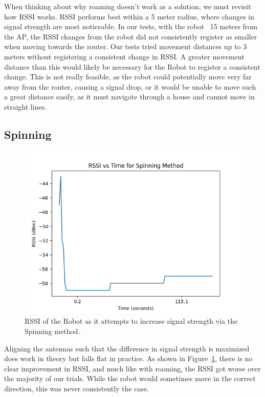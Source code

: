   

When thinking about why roaming doesn’t work as a solution, we must revisit how RSSI works. RSSI performs best within a 5 meter radius, where changes in signal strength are most noticeable. In our tests, with the robot ~15 meters from the AP, the RSSI changes from the robot did not consistently register as smaller when moving towards the router. Our tests tried movement distances up to 3 meters without registering a consistent change in RSSI. A greater movement distance than this would likely be necessary for the Robot to register a consistent change. This is not really feasible, as the robot could potentially move very far away from the router, causing a signal drop, or it would be unable to move such a great distance easily, as it must navigate through a house and cannot move in straight lines.

\subsection{Spinning}

\begin{figure}[tp]

\centering

\includegraphics[scale=0.5]{figures/rssi_microwave}

\caption{RSSI of the Robot as it attempts to increase signal strength via the Spinning method.}

\label{fig:rssi_microwave}

\end{figure}

Aligning the antennas such that the difference in signal strength is maximized does work in theory but falls flat in practice. As shown in Figure~\ref{fig:rssi_microwave}, there is no clear improvement in RSSI, and much like with roaming, the RSSI got worse over the majority of our trials. While the robot would sometimes move in the correct direction, this was never consistently the case.

